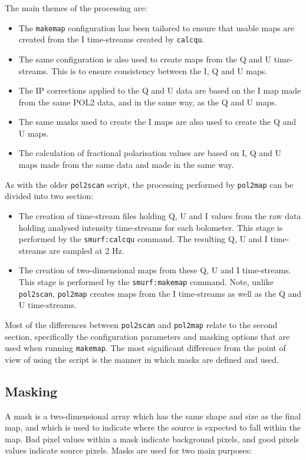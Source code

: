 \documentclass[twoside,11pt]{starlink}
\begin{document}
The main themes of the processing are:

\begin{itemize}
\item The \texttt{makemap} configuration has been tailored to ensure that
usable maps are created from the I time-streams created by \texttt{calcqu}.
\item The same configuration is also used to create maps from the Q and U
time-streams. This is to ensure consistency between the I, Q and U maps.
\item The IP corrections applied to the Q and U data are based on the I
map made from the same POL2 data, and in the same way, as the Q and U maps.
\item The same masks used to create the I maps are also used to create
the Q and U maps.
\item The calculation of fractional polarisation values are based on I, Q
and U maps made from the same data and made in the same way.
\end{itemize}

As with the older \texttt{pol2scan} script, the processing performed by
\texttt{pol2map} can be divided into two section:

\begin{itemize}
\item The creation of time-stream files holding Q, U and I values from
the raw data holding analysed intensity time-streams for each bolometer.
This stage is performed by the \texttt{smurf:calcqu} command. The
resulting Q, U and I time-streams are sampled at 2 Hz.
\item The creation of two-dimensional maps from these Q, U and I
time-streams. This stage is performed by the \texttt{smurf:makemap} command.
Note, unlike \texttt{pol2scan}, \texttt{pol2map} creates maps from the I
time-streams as well as the Q and U time-streams.
\end{itemize}

Most of the differences between \texttt{pol2scan} and \texttt{pol2map}
relate to the second section, specifically the configuration parameters
and masking options that are used when running \texttt{makemap}. The most
significant difference from the point of view of using the script is the manner
in which masks are defined and used.

\subsection{Masking}
A mask is a two-dimensional array which has the same shape and size as
the final map, and which is used to indicate where the source is expected
to fall within the map. Bad pixel values within a mask indicate
background pixels, and good pixels values indicate source pixels. Masks
are used for two main purposes:
\end{document}

